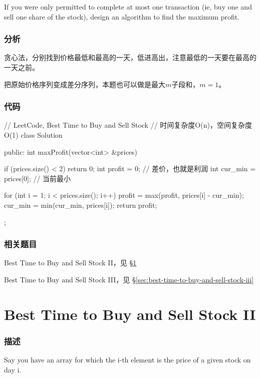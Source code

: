 If you were only permitted to complete at    most one transaction (ie, buy one and sell one share of the stock), design an algorithm to find the maximum profit.


\subsubsection{分析}
贪心法，分别找到价格最低和最高的一天，低进高出，注意最低的一天要在最高的一天之前。

把原始价格序列变成差分序列，本题也可以做是最大$m$子段和，$m=1$。

\subsubsection{代码}
\begin{Code}
// LeetCode, Best Time to Buy and Sell Stock
// 时间复杂度O(n)，空间复杂度O(1)
class Solution {
public:
    int maxProfit(vector<int> &prices) {
        if (prices.size() < 2) return 0;
        int profit = 0;  // 差价，也就是利润
        int cur_min = prices[0]; // 当前最小

        for (int i = 1; i < prices.size(); i++) {
            profit = max(profit, prices[i] - cur_min);
            cur_min = min(cur_min, prices[i]);
        }
        return profit;
    }
};
\end{Code}


\subsubsection{相关题目}
\begindot
\item Best Time to Buy and Sell Stock II，见 \S \ref{sec:best-time-to-buy-and-sell-stock-ii}
\item Best Time to Buy and Sell Stock III，见 \S \ref{sec:best-time-to-buy-and-sell-stock-iii}
\myenddot


\section{Best Time to Buy and Sell Stock II} %
\label{sec:best-time-to-buy-and-sell-stock-ii}


\subsubsection{描述}
Say you have an array for which the i-th element is the price of a given stock on day i.

